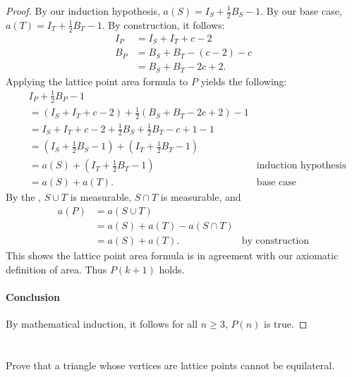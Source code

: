 \documentclass{report}
\begin{document}
\begin{proof}
    By our induction hypothesis, $a(S) = I_S + \frac{1}{2}B_S - 1$.
    By our base case, $a(T) = I_T + \frac{1}{2}B_T - 1$.
    By construction, it follows:
      \begin{align*}
        I_P & = I_S + I_T + c - 2 \\
        B_P & = B_S + B_T - (c - 2) - c \\
            & = B_S + B_T - 2c + 2.
      \end{align*}
    Applying the lattice point area formula to $P$ yields the following:
      \begin{align*}
        & I_P + \frac{1}{2}B_P - 1 \\
          & = (I_S + I_T + c - 2) + \frac{1}{2}(B_S + B_T - 2c + 2) - 1 \\
          & = I_S + I_T + c - 2 + \frac{1}{2}B_S + \frac{1}{2}B_T - c + 1 - 1 \\
          & = (I_S + \frac{1}{2}B_S - 1) + (I_T + \frac{1}{2}B_T - 1) \\
          & = a(S) + (I_T + \frac{1}{2}B_T - 1) & \text{induction hypothesis} \\
          & = a(S) + a(T). & \text{base case}
      \end{align*}
    By the , $S \cup T$ is measurable,
      $S \cap T$ is measurable, and
      \begin{align*}
        a(P)
          & = a(S \cup T) \\
          & = a(S) + a(T) - a(S \cap T) \\
          & = a(S) + a(T). & \text{by construction}
      \end{align*}
    This shows the lattice point area formula is in agreement with our axiomatic
      definition of area.
    Thus $P(k + 1)$ holds.

  \paragraph{Conclusion}%

    By mathematical induction, it follows for all $n \geq 3$, $P(n)$ is true.

\end{proof}

\section{}%
\label{sec:exercise-1.7.5}

Prove that a triangle whose vertices are lattice points cannot be equilateral.
\end{document}
